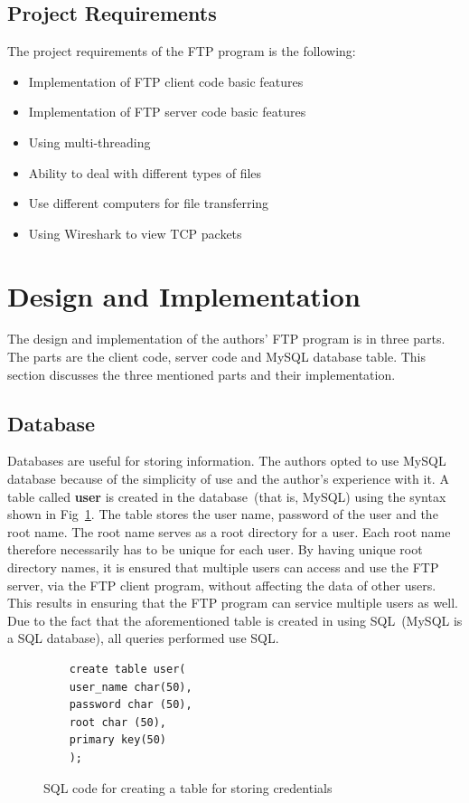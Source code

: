 \documentclass[journal, a4paper]{IEEEtran}
\begin{document}
\subsection{Project Requirements}
The project requirements of the FTP program is the following:

\begin{itemize}
	\item  Implementation of FTP client code basic features
	\item  Implementation of FTP server code basic features
	\item  Using multi-threading
	\item  Ability to deal with different types of files
	\item  Use different computers for file transferring
	\item  Using Wireshark to view TCP packets
\end{itemize}

\section{Design and Implementation}
The design and implementation of the authors' FTP program is in three parts. The parts are the client code, server code and MySQL database table. This section discusses the three mentioned parts and their implementation.

\subsection{Database}

Databases are useful for storing information. The authors opted to use MySQL database because of the simplicity of use and the author's experience with it. A table called \textbf{user} is created in the database~(that is, MySQL) using the syntax shown in Fig~\ref{sqltable}. The table stores the user name, password of the user and the root name. The root name serves as a root directory for a user. Each root name therefore necessarily has to be unique for each user. By having unique root directory names, it is ensured that multiple users can access and use the FTP server, via the FTP client program, without affecting the data of other users. This results in ensuring that the FTP program can service multiple users as well. Due to the fact that the aforementioned table is created in using SQL~(MySQL is a SQL database), all queries performed use SQL.

\begin{figure}[hbtp]
	\begin{lstlisting}
	create table user(
	user_name char(50),
	password char (50),
	root char (50),
	primary key(50)
	);
	\end{lstlisting}
	\caption{SQL code for creating a table for storing credentials}
	\label {sqltable}
\end{figure}
\end{document}
